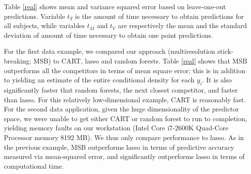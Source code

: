 \documentclass{article} %
\begin{document}
Table \ref{real} shows mean and variance squared error based on leave-one-out predictions. Variable $t_{T}$ is the amount of time necessary to obtain predictions for all subjects, while variables $t_M$ and $t_V$ are respectively the mean and the standard deviation of amount of time necessary to obtain one point predictions.

For the first data example, we compared our approach (multiresolution stick-breaking; MSB) to CART, lasso and random forests. 
Table \ref{real} shows that MSB outperforms all the competitors in terms of mean square error; this is in addition to yielding an estimate of the entire conditional density for each $y_i$.  It is also significantly faster that random forests, the next closest competitor, and faster than lasso.  For this relatively low-dimensional example, CART is reasonably fast.   For the second data application, given the huge dimensionality of the predictor space, we were unable to get either CART or random forest to run to completion, yielding memory faults on our workstation (Intel Core i7-2600K Quad-Core Processor memory 8192 MB).  We thus only compare performance to lasso.  As in the previous example, MSB outperforms lasso in terms of predictive accuracy measured via mean-squared error, and significantly outperforms lasso in terms of computational time.  
\end{document}
